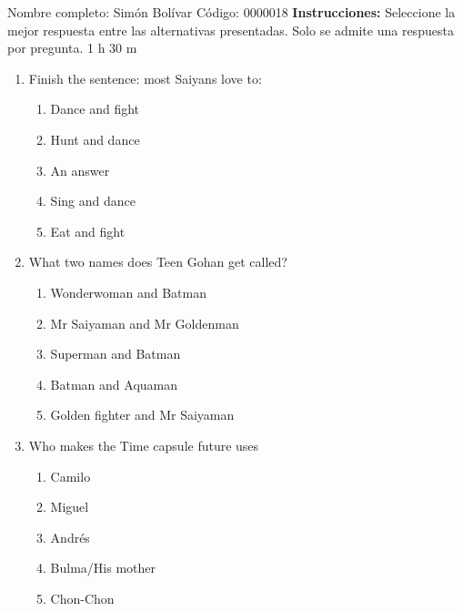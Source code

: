 \documentclass[letterpaper,addpoints,answers,twocolumn,10pt]{exam}
\begin{document}
\noindent Nombre completo: Simón Bolívar
\newline \newline \newline \newline
Código: 0000018\newline \newline 
{\bf Instrucciones:} Seleccione la mejor respuesta entre las alternativas presentadas. Solo se admite una respuesta por pregunta.
 1 h 30 m

\begin{enumerate}[leftmargin=.2in]




\item  Finish the sentence: most Saiyans love to:


\begin{enumerate}[noitemsep,leftmargin=0in]


\item  Dance and fight
\item  Hunt and dance
\item  An answer
\item  Sing and dance
\item  Eat and fight


\end{enumerate}



\item  What two names does Teen Gohan get called?


\begin{enumerate}[noitemsep,leftmargin=0in]


\item  Wonderwoman and Batman
\item  Mr Saiyaman and Mr Goldenman
\item  Superman and Batman
\item  Batman and Aquaman
\item  Golden fighter and Mr Saiyaman


\end{enumerate}



\item  Who makes the Time capsule future uses


\begin{enumerate}[noitemsep,leftmargin=0in]


\item  Camilo
\item  Miguel
\item  Andrés
\item  Bulma/His mother
\item  Chon-Chon



\end{enumerate}
\end{enumerate}
\end{document}
